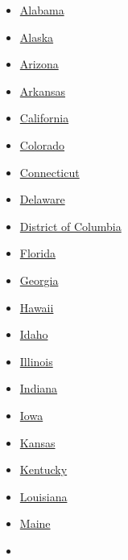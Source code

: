 \begin{itemize}
\tightlist
\item
  \href{//www.nytimes3xbfgragh.onion/elections/2016/results/alabama}{Alabama}
\item
  \href{//www.nytimes3xbfgragh.onion/elections/2016/results/alaska}{Alaska}
\item
  \href{//www.nytimes3xbfgragh.onion/elections/2016/results/arizona}{Arizona}
\item
  \href{//www.nytimes3xbfgragh.onion/elections/2016/results/arkansas}{Arkansas}
\item
  \href{//www.nytimes3xbfgragh.onion/elections/2016/results/california}{California}
\item
  \href{//www.nytimes3xbfgragh.onion/elections/2016/results/colorado}{Colorado}
\item
  \href{//www.nytimes3xbfgragh.onion/elections/2016/results/connecticut}{Connecticut}
\item
  \href{//www.nytimes3xbfgragh.onion/elections/2016/results/delaware}{Delaware}
\item
  \href{//www.nytimes3xbfgragh.onion/elections/2016/results/district-of-columbia}{District
  of Columbia}
\item
  \href{//www.nytimes3xbfgragh.onion/elections/2016/results/florida}{Florida}
\item
  \href{//www.nytimes3xbfgragh.onion/elections/2016/results/georgia}{Georgia}
\item
  \href{//www.nytimes3xbfgragh.onion/elections/2016/results/hawaii}{Hawaii}
\item
  \href{//www.nytimes3xbfgragh.onion/elections/2016/results/idaho}{Idaho}
\item
  \href{//www.nytimes3xbfgragh.onion/elections/2016/results/illinois}{Illinois}
\item
  \href{//www.nytimes3xbfgragh.onion/elections/2016/results/indiana}{Indiana}
\item
  \href{//www.nytimes3xbfgragh.onion/elections/2016/results/iowa}{Iowa}
\item
  \href{//www.nytimes3xbfgragh.onion/elections/2016/results/kansas}{Kansas}
\item
  \href{//www.nytimes3xbfgragh.onion/elections/2016/results/kentucky}{Kentucky}
\item
  \href{//www.nytimes3xbfgragh.onion/elections/2016/results/louisiana}{Louisiana}
\item
  \href{//www.nytimes3xbfgragh.onion/elections/2016/results/maine}{Maine}
\item

\end{itemize}
